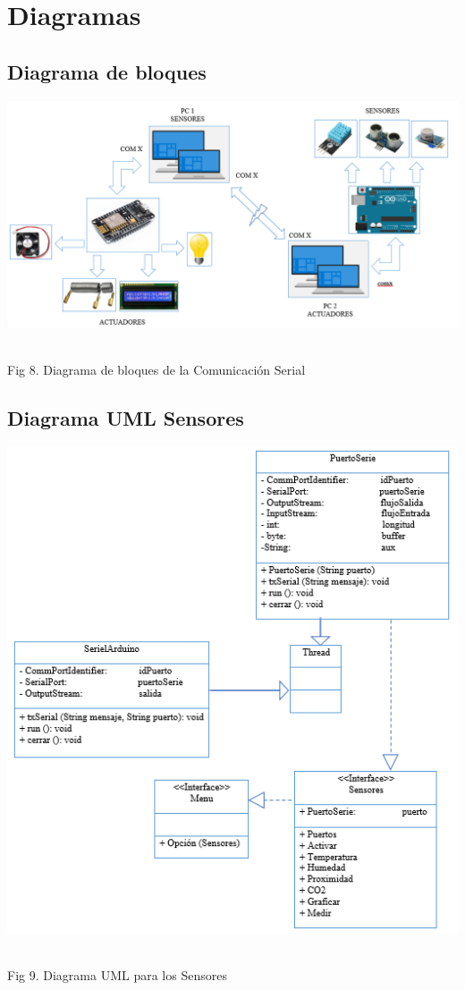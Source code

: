 \documentclass[12pt]{report}
\begin{document}
 \section{Diagramas}
\subsection{Diagrama de bloques}

 \begin{center}
\includegraphics[scale=0.58]{Documento/Figuras/fig8.PNG}
\begin{scriptsize}\\ 
Fig 8. Diagrama de bloques de la Comunicación Serial
\end{scriptsize}
\end{center}

\subsection{Diagrama UML Sensores}
 \begin{center}
\includegraphics[scale=0.58]{Documento/Figuras/fig9.PNG}
\begin{scriptsize}\\ 
Fig 9. Diagrama UML para los Sensores
\end{scriptsize}
\end{center}
\end{document}
